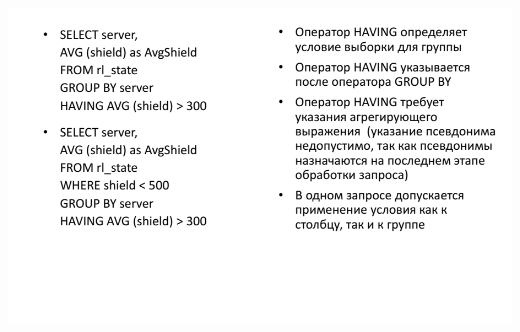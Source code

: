 \documentclass{beamer}
\begin{document}
\begin{frame}
	\begin{center}
		\includegraphics[scale=0.5]{images/having.png}
	\end{center}
\end{frame} 
\end{document}
